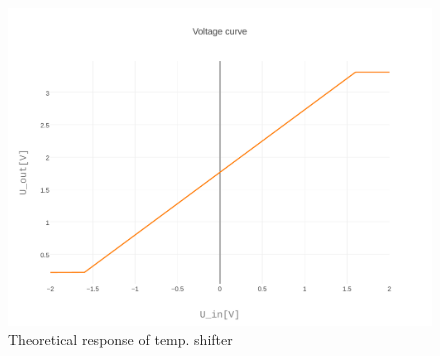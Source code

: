 \documentclass[12pt]{scrartcl}
\begin{document}
      \begin{figure}[h]
        \includegraphics[width = \textwidth]{./plots/plot_image.pdf}
        \caption{Theoretical response of temp. shifter}
        \label{fig2}
      \end{figure}
\end{document}
